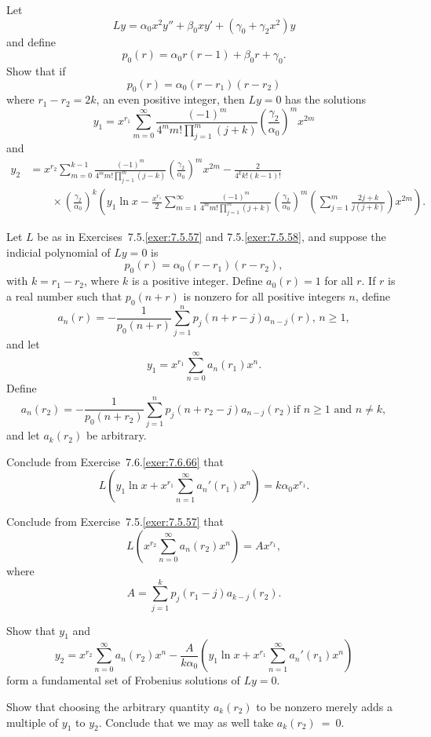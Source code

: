 \begin{exerciselist}
\item\label{exer:7.7.47}Let
\[
Ly=\alpha_0x^2y''+\beta_0xy'+(\gamma_0+\gamma_2x^2)y
\]
and define
\[
p_0(r)=\alpha_0r(r-1)+\beta_0r+\gamma_0.
\]
Show that if
\[
p_0(r)=\alpha_0(r-r_1)(r-r_2)
\]
where $r_1-r_2=2k$, an even  positive integer, then $Ly=0$ has the
solutions
\[
y_1=x^{r_1}\sum_{m=0}^\infty\frac{(-1)^m}{4^mm!\prod_{j=1}^m(j+k)}\left(\frac{\gamma_2}{\alpha_0}\right)^m x^{2m}
\]
and
\begin{align*}
y_2&=x^{r_2}\sum_{m=0}^{k-1}\frac{(-1)^m}{4^mm!\prod_{j=1}^m(j-k)}
\left(\frac{\gamma_2}{\alpha_0}\right)^m
x^{2m}-
\frac{2}{4^kk!(k-1)!}\\
&\qquad{}\times\left(\frac{\gamma_2}{\alpha_0}\right)^k\left(y_1\ln x-
\frac{x^{r_1}}{2}\sum_{m=1}^\infty\frac{(-1)^m}{4^mm!\prod_{j=1}^m(j+k)}\left(\frac{\gamma_2}{\alpha_0}\right)^m
\left(\sum_{j=1}^m\frac{2j+k}{j(j+k)}\right)x^{2m}\right).
\end{align*}

\item\label{exer:7.7.48}Let $L$ be as in {Exercises~7.5.\ref{exer:7.5.57}} and
 {7.5.\ref{exer:7.5.58}}, and
suppose the indicial polynomial  of $Ly=0$ is
\[
p_0(r)=\alpha_0(r-r_1)(r-r_2),
\]
with $k=r_1-r_2$, where $k$ is a positive integer. Define $a_0(r)=1$
for all $r$.  If $r$ is a real number such that $p_0(n+r)$
is nonzero for all positive integers $n$,  define
\[
a_n(r)=-\frac{1}{p_0(n+r)}\sum_{j=1}^n p_j(n+r-j)a_{n-j}(r),\,n\ge1,
\]
and let
\[
y_1=x^{r_1}\sum_{n=0}^\infty a_n(r_1)x^n.
\]
Define
\[
a_n(r_2)=-\frac{1}{p_0(n+r_2)}\sum_{j=1}^n p_j(n+r_2-j)a_{n-j}(r_2)\text{
if } n\ge1\text{ and }n\ne k,
\]
and let $a_k(r_2)$ be arbitrary.
\begin{alist}
\item %
Conclude from {Exercise~7.6.\ref{exer:7.6.66}} that
\[
L\left(y_1\ln x+x^{r_1}\sum_{n=1}^\infty
a_n'(r_1)x^n\right)=k\alpha_0x^{r_1}.
\]
\item %
Conclude from {Exercise~7.5.\ref{exer:7.5.57}} that
\[
L\left(x^{r_2}\sum_{n=0}^\infty a_n(r_2)x^n\right)=Ax^{r_1},
\]
where
\[
A=\sum_{j=1}^k p_j(r_1-j)a_{k-j}(r_2).
\]
\item %
Show that $y_1$  and
\[
y_2=x^{r_2}\sum_{n=0}^\infty a_n(r_2)x^n
-\frac{A}{k\alpha_0}
\left(y_1 \ln x+x^{r_1}\sum_{n=1}^\infty a_n'(r_1)x^n\right)
\]
form a fundamental set of Frobenius solutions of $Ly=0$.
\item %
Show that choosing the arbitrary quantity $a_k(r_2)$ to be nonzero
merely adds a multiple of $y_1$ to $y_2$. Conclude that we may
as well take $a_k(r_2)~=~0$.
\end{alist}
\end{exerciselist}
